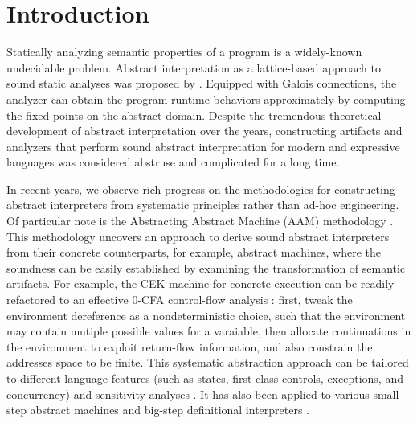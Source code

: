 \section{Introduction} \label{intro}

Statically analyzing semantic properties of a program is a
widely-known undecidable problem. Abstract interpretation as a
lattice-based approach to sound static analyses was proposed by
\citet{DBLP:conf/popl/CousotC77}. Equipped with Galois connections,
the analyzer can obtain the program runtime behaviors approximately by
computing the fixed points on the abstract domain. Despite the
tremendous theoretical development of abstract interpretation over the
years, constructing artifacts and analyzers that perform sound
abstract interpretation for modern and expressive languages was
considered abstruse and complicated for a long time.

In recent years, we observe rich progress on the methodologies for
constructing abstract interpreters from systematic principles rather than
ad-hoc engineering. Of particular note is the Abstracting Abstract
Machine (AAM) methodology \cite{DBLP:journals/jfp/HornM12,
  DBLP:conf/icfp/HornM10}. This methodology uncovers an approach to derive sound
abstract interpreters from their concrete counterparts, for example,
abstract machines, where the soundness can be easily established by
examining the transformation of semantic artifacts. For example, the
CEK machine \cite{DBLP:conf/popl/FelleisenF87} for concrete execution
can be readily refactored to an effective $0$-CFA control-flow
analysis \cite{Shivers:1988:CFA:53990.54007,
  Midtgaard:2012:CAF:2187671.2187672}: first, tweak the environment
dereference as a nondeterministic choice, such that the environment
may contain mutiple possible values for a varaiable, then allocate
continuations in the environment to exploit return-flow information,
and also constrain the addresses space to be finite.  This systematic
abstraction approach can be tailored to different language features
(such as states, first-class controls, exceptions, and concurrency) and
sensitivity analyses \cite{DBLP:conf/icfp/Gilray0M16,
  DBLP:conf/popl/GilrayL0MH16, Darais:2015:GTM:2814270.2814308}. It
has also been applied to various small-step abstract machines
\cite{DBLP:journals/jfp/HornM12, DBLP:conf/icfp/HornM10,
  Sergey:2013:MAI:2491956.2491979} and big-step definitional
interpreters \cite{Wei:2018:RAA:3243631.3236800,
  DBLP:journals/pacmpl/DaraisLNH17, Keidel:2018:CSP:3243631.3236767}.

